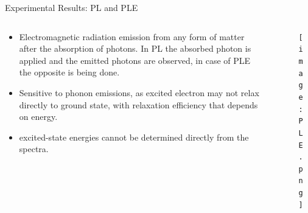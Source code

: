 \documentclass{beamer}
\begin{document}
\begin{frame}{Experimental Results: PL and PLE}
    \begin{columns}
        \begin{column}{0.6\textwidth}
            \begin{itemize}
                \item Electromagnetic radiation emission from any form of matter after the absorption of photons. In PL the absorbed photon is applied and the emitted photons are observed, in case of PLE the opposite is being done.
                \item Sensitive to phonon emissions, as excited electron may not relax directly to ground state, with relaxation efficiency that depends on energy.
                \item excited-state energies cannot be determined directly from the spectra.
            \end{itemize}
        \end{column}
        \begin{column}{0.4\textwidth}
            \begin{figure}
                \centering
                \texttt{[image: PLE.png]}
                \label{fig:PLE}
            \end{figure}
        \end{column}
    \end{columns}
\end{frame}
\end{document}
